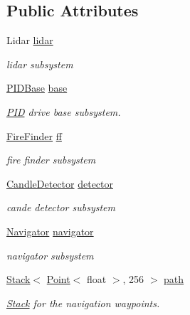 \subsection*{Public Attributes}
\begin{DoxyCompactItemize}
\item 
Lidar \hyperlink{classRobot_a222e54f477e23f5af80cfa10bcd85e7a}{lidar}
\begin{DoxyCompactList}\small\item\em lidar subsystem \end{DoxyCompactList}\item 
\hyperlink{classPIDBase}{P\-I\-D\-Base} \hyperlink{classRobot_adbf538f97c0f9f98337f5171e715badc}{base}
\begin{DoxyCompactList}\small\item\em \hyperlink{classPID}{P\-I\-D} drive base subsystem. \end{DoxyCompactList}\item 
\hyperlink{classFireFinder}{Fire\-Finder} \hyperlink{classRobot_a342f5f8be2b5641eb3ae8f9c8475ebe6}{ff}
\begin{DoxyCompactList}\small\item\em fire finder subsystem \end{DoxyCompactList}\item 
\hyperlink{classCandleDetector}{Candle\-Detector} \hyperlink{classRobot_a19cb4c2ee87b595db9275e6b3d9ca30d}{detector}
\begin{DoxyCompactList}\small\item\em cande detector subsystem \end{DoxyCompactList}\item 
\hyperlink{classNavigator}{Navigator} \hyperlink{classRobot_a71e296a4f32c3a81b5a9fabeac12747b}{navigator}
\begin{DoxyCompactList}\small\item\em navigator subsystem \end{DoxyCompactList}\item 
\hyperlink{classStack}{Stack}$<$ \hyperlink{classPoint}{Point}$<$ float $>$, 256 $>$ \hyperlink{classRobot_a36d071e82aea40470cea9559477e5115}{path}
\begin{DoxyCompactList}\small\item\em \hyperlink{classStack}{Stack} for the navigation waypoints. \end{DoxyCompactList}\end{DoxyCompactItemize}
